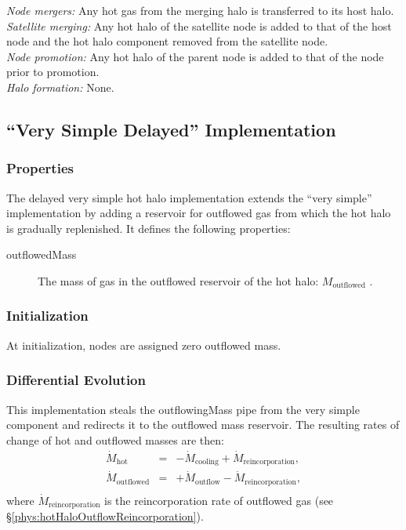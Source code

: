 \noindent\emph{Node mergers:} Any hot gas from the merging halo is transferred to its host halo.\\

\noindent\emph{Satellite merging:} Any hot halo of the satellite \gls{node} is added to that of the host \gls{node} and the hot halo \gls{component} removed from the satellite node.\\

\noindent\emph{Node promotion:} Any hot halo of the parent \gls{node} is added to that of the \gls{node} prior to promotion.\\

\noindent\emph{Halo formation:} None.\\

\subsection{``Very Simple Delayed'' Implementation}

\subsubsection{Properties}

The delayed very simple hot halo implementation extends the ``very simple'' implementation by adding a reservoir for outflowed gas from which the hot halo is gradually replenished. It defines the following properties:
\begin{description}
 \item [{\normalfont \ttfamily outflowedMass}] The mass of gas in the outflowed reservoir of the hot halo: $M_\mathrm{outflowed}$ {\normalfont \ttfamily [hotHaloOutflowedMass]}.
\end{description}

\subsubsection{Initialization}

At initialization, nodes are assigned zero outflowed mass.

\subsubsection{Differential Evolution}

This implementation steals the {\normalfont \ttfamily outflowingMass} pipe from the very simple component and redirects it to the outflowed mass reservoir. The resulting rates of change of hot and outflowed masses are then:
\begin{eqnarray}
 \dot{M}_\mathrm{hot}      &=& - \dot{M}_\mathrm{cooling} + \dot{M}_\mathrm{reincorporation}, \nonumber \\
 \dot{M}_\mathrm{outflowed} &=& + \dot{M}_\mathrm{outflow} - \dot{M}_\mathrm{reincorporation}, \nonumber \\
\end{eqnarray}
where $\dot{M}_\mathrm{reincorporation}$ is the reincorporation rate of outflowed gas (see \S\ref{phys:hotHaloOutflowReincorporation}).

